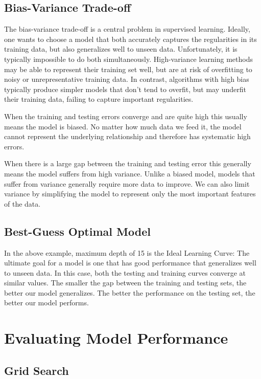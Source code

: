\documentclass[a4project, twocolumn]{article}
\begin{document}
\subsection{Bias-Variance Trade-off}

The bias-variance trade-off is a central problem in supervised learning. Ideally, one wants to choose a model that both accurately captures the regularities in its training data, but also generalizes well to unseen data. Unfortunately, it is typically impossible to do both simultaneously. High-variance learning methods may be able to represent their training set well, but are at risk of overfitting to noisy or unrepresentative training data.
In contrast, algorithms with high bias typically produce simpler models that don't tend to overfit, but may underfit their training data, failing to capture important regularities.

When the training and testing errors converge and are quite high this usually means the model is biased. No matter how much data we feed it, the model cannot represent the underlying relationship and therefore has systematic high errors.

When there is a large gap between the training and testing error this generally means the model suffers from high variance. Unlike a biased model, models that suffer from variance generally require more data to improve. We can also limit variance by simplifying the model to represent only the most important features of the data.

\subsection{Best-Guess Optimal Model}

In the above example, maximum depth of 15 is the Ideal Learning Curve: The ultimate goal for a model is one that has good performance that generalizes well to unseen data. In this case, both the testing and training curves converge at similar values. The smaller the gap between the training and testing sets, the better our model generalizes. The better the performance on the testing set, the better our model performs.

\section{Evaluating Model Performance}

\subsection{Grid Search}
\end{document}
